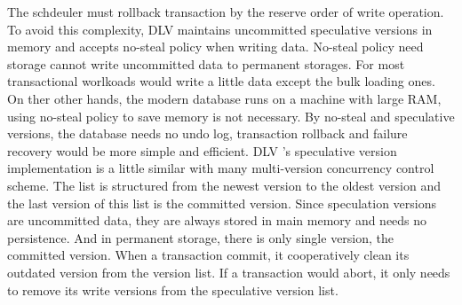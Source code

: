 \documentclass[conference]{IEEEtran}
\begin{document}
The schdeuler must rollback transaction by the reserve order of write operation.
To avoid this complexity, 
DLV maintains uncommitted speculative versions in memory and accepts no-steal policy when writing data.
No-steal policy need storage cannot write uncommitted data to permanent storages.
For most transactional worlkoads would write a little data except the bulk loading ones.
On ther other hands, the modern database runs on a machine with large RAM, using no-steal policy to save memory is not necessary.
By no-steal and speculative versions, the database needs no undo log, transaction rollback and failure recovery would be more simple and efficient.
DLV 's speculative version implementation is a little similar with many multi-version concurrency control scheme.
The list is structured from the newest version to the oldest version and the last version of this list is the committed version.
Since speculation versions are uncommitted data, they are always stored in main memory and needs no persistence.
And in permanent storage, there is only single version, the committed version.
When a transaction commit, it cooperatively clean its outdated version from the version list. 
If a transaction would abort, it only needs to remove its write versions from the speculative version list.
\end{document}

